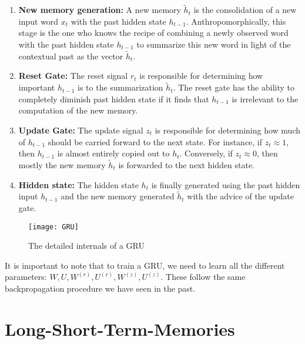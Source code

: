 \documentclass{tufte-handout}
\begin{document}
\begin{enumerate}
\item \textbf{New memory generation:} A new memory $\tilde{h}_{t}$ is the consolidation of a new input word $x_{t}$ with the past hidden state $h_{t-1}$. Anthropomorphically, this stage is the one who knows the recipe of combining a newly observed word with the past hidden state $h_{t-1}$ to summarize this new word in light of the contextual past as the vector $\tilde{h}_{t}$.
\item \textbf{Reset Gate:} The reset signal $r_{t}$ is responsible for determining how important $h_{t-1}$ is to the summarization $\tilde{h}_{t}$. The reset gate has the ability to completely diminish past hidden state if it finds that $h_{t-1}$ is irrelevant to the computation of the new memory.
\item \textbf{Update Gate:} The update signal $z_{t}$ is responsible for determining how much of $h_{t-1}$ should be carried forward to the next state. For instance, if $z_{t} \approx 1$, then $h_{t-1}$ is almost entirely copied out to $h_{t}$. Conversely, if $z_{t} \approx 0$, then mostly the new memory $\tilde{h}_{t}$ is forwarded to the next hidden state.
\item \textbf{Hidden state:} The hidden state $h_{t}$ is finally generated using the past hidden input $h_{t-1}$ and the new memory generated $\tilde{h}_{t}$ with the advice of the update gate.
\end{enumerate}

\begin{figure*}%
  \texttt{[image: GRU]}
  \caption{The detailed internals of a GRU}
  \label{fig:GRU}
\end{figure*}

It is important to note that to train a GRU, we need to learn all the different parameters: $W, U, W^{(r)}, U^{(r)}, W^{(z)}, U^{(z)}$. These follow the same backpropagation procedure we have seen in the past.

\section{Long-Short-Term-Memories}\label{sec:lstm}
\end{document}
